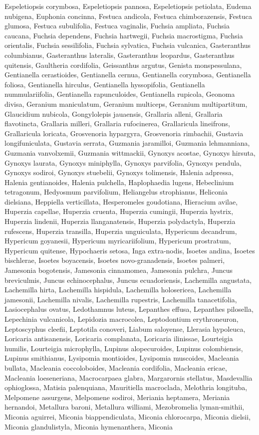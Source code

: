 \documentclass[]{article}
\begin{document}
Espeletiopsis corymbosa, Espeletiopsis pannosa, Espeletiopsis petiolata, Eudema nubigena, Euphonia concinna, Festuca andicola, Festuca chimborazensis, Festuca glumosa, Festuca subulifolia, Festuca vaginalis, Fuchsia ampliata, Fuchsia caucana, Fuchsia dependens, Fuchsia hartwegii, Fuchsia macrostigma, Fuchsia orientalis, Fuchsia sessilifolia, Fuchsia sylvatica, Fuchsia vulcanica, Gasteranthus columbianus, Gasteranthus lateralis, Gasteranthus leopardus, Gasteranthus quitensis, Gaultheria cordifolia, Geissanthus argutus, Genista monspessulana, Gentianella cerastioides, Gentianella cernua, Gentianella corymbosa, Gentianella foliosa, Gentianella hirculus, Gentianella hyssopifolia, Gentianella nummulariifolia, Gentianella rapunculoides, Gentianella rupicola, Geonoma divisa, Geranium maniculatum, Geranium multiceps, Geranium multipartitum, Glaucidium nubicola, Gongylolepis jauaensis, Grallaria alleni, Grallaria flavotincta, Grallaria milleri, Grallaria rufocinerea, Grallaricula lineifrons, Grallaricula loricata, Grosvenoria hypargyra, Grosvenoria rimbachii, Gustavia longifuniculata, Gustavia serrata, Guzmania jaramilloi, Guzmania lehmanniana, Guzmania vanvolxemii, Guzmania wittmackii, Gynoxys acostae, Gynoxys hirsuta, Gynoxys laurata, Gynoxys miniphylla, Gynoxys parvifolia, Gynoxys pendula, Gynoxys sodiroi, Gynoxys stuebelii, Gynoxys tolimensis, Halenia adpressa, Halenia gentianoides, Halenia pulchella, Haplophaedia lugens, Hebeclinium tetragonum, Hedyosmum parvifolium, Heliangelus strophianus, Heliconia dielsiana, Heppiella verticillata, Hesperomeles goudotiana, Hieracium avilae, Huperzia capellae, Huperzia cruenta, Huperzia cumingii, Huperzia hystrix, Huperzia lindenii, Huperzia llanganatensis, Huperzia polydactyla, Huperzia rufescens, Huperzia transilla, Huperzia unguiculata, Hypericum decandrum, Hypericum goyanesii, Hypericum myricariifolium, Hypericum prostratum, Hypericum quitense, Hypochaeris setosa, Inga extra-nodis, Isoetes andina, Isoetes bischlerae, Isoetes boyacensis, Isoetes novo-granadensis, Isoetes palmeri, Jamesonia bogotensis, Jamesonia cinnamomea, Jamesonia pulchra, Juncus breviculmis, Juncus echinocephalus, Juncus ecuadoriensis, Lachemilla angustata, Lachemilla hirta, Lachemilla hispidula, Lachemilla holosericea, Lachemilla jamesonii, Lachemilla nivalis, Lachemilla rupestris, Lachemilla tanacetifolia, Lasiocephalus ovatus, Ledothamnus luteus, Lepanthes effusa, Lepanthes pilosella, Lepechinia vulcanicola, Lepidozia macrocolea, Leptodontium erythroneuron, Leptoscyphus cleefii, Leptotila conoveri, Liabum saloyense, Llerasia hypoleuca, Loricaria antisanensis, Loricaria complanata, Loricaria ilinissae, Lourteigia humilis, Lourteigia microphylla, Lupinus alopecuroides, Lupinus colombiensis, Lupinus smithianus, Lysipomia montioides, Lysipomia muscoides, Macleania bullata, Macleania coccoloboides, Macleania cordifolia, Macleania ericae, Macleania loeseneriana, Macrocarpaea glabra, Margarornis stellatus, Masdevallia ophioglossa, Matisia palenquiana, Mauritiella macroclada, Melothria longituba, Melpomene assurgens, Melpomene sodiroi, Meriania heptamera, Meriania hernandoi, Metallura baroni, Metallura williami, Mezobromelia lyman-smithii, Miconia aguirrei, Miconia biappendiculata, Miconia chlorocarpa, Miconia dielsii, Miconia glandulistyla, Miconia hymenanthera, Miconia 
\end{document}
